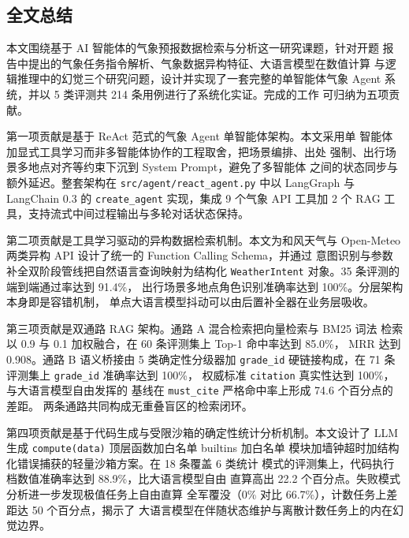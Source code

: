 
\subsection{全文总结}
\label{sec:summary}

本文围绕基于 AI 智能体的气象预报数据检索与分析这一研究课题，针对开题
报告中提出的气象任务指令解析、气象数据异构特征、大语言模型在数值计算
与逻辑推理中的幻觉三个研究问题，设计并实现了一套完整的单智能体气象
Agent 系统，并以 5 类评测共 214 条用例进行了系统化实证。完成的工作
可归纳为五项贡献。

第一项贡献是基于 ReAct 范式的气象 Agent 单智能体架构。本文采用单
智能体加显式工具学习而非多智能体协作的工程取舍，把场景编排、出处
强制、出行场景多地点对齐等约束下沉到 System Prompt，避免了多智能体
之间的状态同步与额外延迟。整套架构在
\texttt{src/\bk{}agent/\bk{}react\_\bk{}agent.\bk{}py} 中以 LangGraph 与 LangChain 0.3
的 \texttt{create\_\bk{}agent} 实现，集成 9 个气象 API 工具加 2 个 RAG
工具，支持流式中间过程输出与多轮对话状态保持。

第二项贡献是工具学习驱动的异构数据检索机制。本文为和风天气与
Open-Meteo 两类异构 API 设计了统一的 Function Calling Schema，并通过
意图识别与参数补全双阶段管线把自然语言查询映射为结构化
\texttt{WeatherIntent} 对象。35 条评测的端到端通过率达到 91.4\%，
出行场景多地点角色识别准确率达到 100\%。分层架构本身即是容错机制，
单点大语言模型抖动可以由后置补全器在业务层吸收。

第三项贡献是双通路 RAG 架构。通路 A 混合检索把向量检索与 BM25 词法
检索以 0.9 与 0.1 加权融合，在 60 条评测集上 Top-1 命中率达到 85.0\%，
MRR 达到 0.908。通路 B 语义桥接由 5 类确定性分级器加 \texttt{grade\_\bk{}id}
硬链接构成，在 71 条评测集上 \texttt{grade\_\bk{}id} 准确率达到 100\%，
权威标准 \texttt{citation} 真实性达到 100\%，与大语言模型自由发挥的
基线在 \texttt{must\_\bk{}cite} 严格命中率上形成 74.6 个百分点的差距。
两条通路共同构成无重叠盲区的检索闭环。

第四项贡献是基于代码生成与受限沙箱的确定性统计分析机制。本文设计了
LLM 生成 \texttt{compute(data)} 顶层函数加白名单 builtins 加白名单
模块加墙钟超时加结构化错误捕获的轻量沙箱方案。在 18 条覆盖 6 类统计
模式的评测集上，代码执行档数值准确率达到 88.9\%，比大语言模型自由
直算高出 22.2 个百分点。失败模式分析进一步发现极值任务上自由直算
全军覆没（0\% 对比 66.7\%），计数任务上差距达 50 个百分点，揭示了
大语言模型在伴随状态维护与离散计数任务上的内在幻觉边界。

